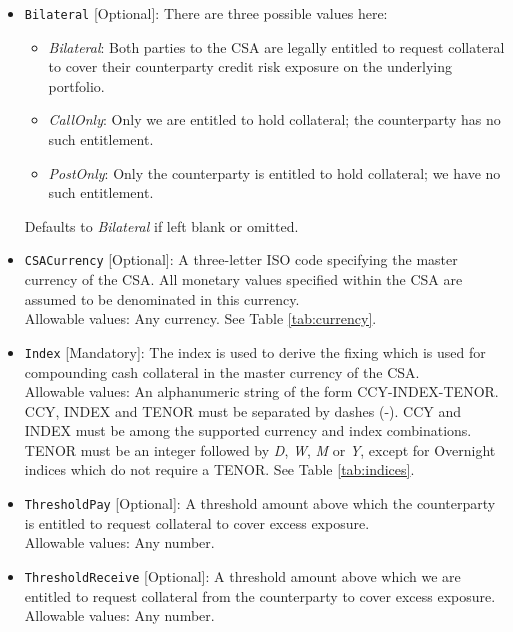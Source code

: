 \begin{itemize}
  \item \lstinline!Bilateral! [Optional]: There are three possible values here:
  \begin{itemize}
    \item \emph{Bilateral}: Both parties to the CSA are legally entitled to
      request collateral to cover their counterparty credit risk exposure
      on the underlying portfolio.
    \item \emph{CallOnly}: Only we are entitled to hold collateral; the
      counterparty has no such entitlement.
    \item \emph{PostOnly}: Only the counterparty is entitled to hold collateral;
      we have no such entitlement.
  \end{itemize}
  Defaults to \emph{Bilateral} if left blank or omitted.
  
  \item \lstinline!CSACurrency! [Optional]: A three-letter ISO code specifying the master
  currency of the CSA. All monetary values specified within the CSA are
  assumed to be denominated in this currency.\\
  Allowable values: Any currency. See Table \ref{tab:currency}.

  \item \lstinline!Index! [Mandatory]: The index is used to derive the fixing which is used
  for compounding cash collateral in the master currency of the CSA.\\
  Allowable values: An alphanumeric string of the form CCY-INDEX-TENOR. CCY, INDEX and TENOR must be separated by dashes (-). CCY and INDEX must be among the supported currency and index combinations. TENOR must be an integer followed by \emph{D}, \emph{W}, \emph{M} or \emph{Y}, except for Overnight indices which do not require a TENOR. See Table \ref{tab:indices}.

  \item \lstinline!ThresholdPay! [Optional]: A threshold amount above which the
  counterparty is entitled to request collateral to cover excess
  exposure.\\
  Allowable values: Any number.

  \item \lstinline!ThresholdReceive! [Optional]: A threshold amount above which we are
  entitled to request collateral from the counterparty to cover excess
  exposure.\\
  Allowable values: Any number.


\end{itemize}
